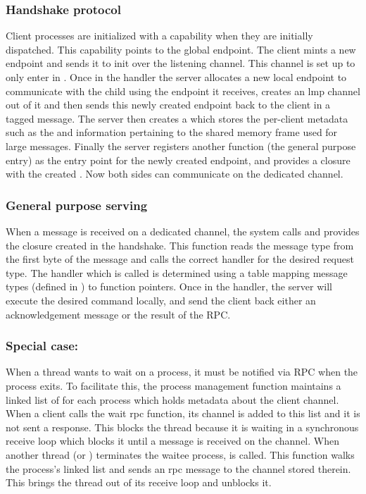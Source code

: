 \subsubsection{Handshake protocol}
Client processes are initialized with a capability  when they are initially dispatched. This capability
points to the global endpoint. The client mints a new endpoint and sends it to init over the listening channel. This channel
is set up to only enter in . Once in the handler the server allocates a new local endpoint
to communicate with the child using the endpoint it receives, creates an lmp channel out of it and then sends this newly created endpoint back to the client
in a  tagged message. The server then creates a  which stores the per-client metadata
 such as the  and information pertaining to the shared memory frame used for large messages. Finally the server registers another function  (the general purpose entry)
as the entry point for the newly created endpoint, and provides a closure with the created . Now both sides can communicate on the dedicated channel.

\subsubsection{General purpose serving}
When a message is received on a dedicated channel, the system calls  and provides the closure created in the handshake. This function
reads the message type from the first byte of the message and calls the correct handler for the desired request type. The handler which is called is determined
using a table mapping message types (defined in ) to function pointers. Once in the handler, the server will execute the desired command
locally, and send the client back either an acknowledgement message or the result of the RPC.

\subsubsection{Special case: }
When a thread wants to wait on a process, it must be notified via RPC when the process exits. To facilitate this, the process management function  maintains a linked list of 
 for each process which holds metadata about the client channel. When a client calls the wait rpc function, its channel is added to this list and it is not
sent a response. This blocks the thread because it is waiting in a synchronous receive loop which blocks it until
a message is received on the channel. When another thread (or ) terminates the waitee process,  is called.
This function walks the process's  linked list and sends an rpc message to the channel stored therein.
 This brings the thread out of its receive loop and unblocks it.


